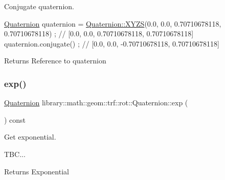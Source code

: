 Conjugate quaternion. 


\begin{DoxyCode}
\hyperlink{classlibrary_1_1math_1_1geom_1_1trf_1_1rot_1_1_quaternion_aa7f459a08f5af38b9f7676a6bf36a21c}{Quaternion} quaternion = \hyperlink{classlibrary_1_1math_1_1geom_1_1trf_1_1rot_1_1_quaternion_ad6426210c54c79fc5296b5375380a7ca}{Quaternion::XYZS}(0.0, 0.0, 0.70710678118, 0.70710678118) 
      ; \textcolor{comment}{// [0.0, 0.0, 0.70710678118, 0.70710678118]}
quaternion.conjugate() ; \textcolor{comment}{// [0.0, 0.0, -0.70710678118, 0.70710678118]}
\end{DoxyCode}


\begin{DoxyReturn}{Returns}
Reference to quaternion 
\end{DoxyReturn}
\mbox{\label{classlibrary_1_1math_1_1geom_1_1trf_1_1rot_1_1_quaternion_a171373818023a1c013891d4297360542}} 
\subsubsection{\texorpdfstring{exp()}{exp()}}
{\footnotesize\ttfamily \hyperlink{classlibrary_1_1math_1_1geom_1_1trf_1_1rot_1_1_quaternion}{Quaternion} library\+::math\+::geom\+::trf\+::rot\+::\+Quaternion\+::exp (\begin{DoxyParamCaption}{ }\end{DoxyParamCaption}) const}



Get exponential. 


\begin{DoxyCode}
TBC...
\end{DoxyCode}


\begin{DoxyReturn}{Returns}
Exponential 
\end{DoxyReturn}
\mbox{\label{classlibrary_1_1math_1_1geom_1_1trf_1_1rot_1_1_quaternion_ac9560aa15c9c4682dd571983bf3f4ab6}} 
